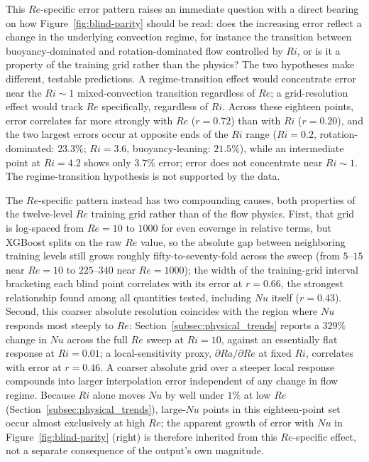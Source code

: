 This $Re$-specific error pattern raises an immediate question with a direct bearing on how Figure~\ref{fig:blind-parity} should be read: does the increasing error reflect a change in the underlying convection regime, for instance the transition between buoyancy-dominated and rotation-dominated flow controlled by $Ri$, or is it a property of the training grid rather than the physics? The two hypotheses make different, testable predictions. A regime-transition effect would concentrate error near the $Ri\sim1$ mixed-convection transition regardless of $Re$; a grid-resolution effect would track $Re$ specifically, regardless of $Ri$. Across these eighteen points, error correlates far more strongly with $Re$ ($r=0.72$) than with $Ri$ ($r=0.20$), and the two largest errors occur at opposite ends of the $Ri$ range ($Ri=0.2$, rotation-dominated: $23.3\%$; $Ri=3.6$, buoyancy-leaning: $21.5\%$), while an intermediate point at $Ri=4.2$ shows only $3.7\%$ error; error does not concentrate near $Ri\sim1$. The regime-transition hypothesis is not supported by the data.

The $Re$-specific pattern instead has two compounding causes, both properties of the twelve-level $Re$ training grid rather than of the flow physics. First, that grid is log-spaced from $Re=10$ to $1000$ for even coverage in relative terms, but XGBoost splits on the raw $Re$ value, so the absolute gap between neighboring training levels still grows roughly fifty-to-seventy-fold across the sweep (from $5$--$15$ near $Re=10$ to $225$--$340$ near $Re=1000$); the width of the training-grid interval bracketing each blind point correlates with its error at $r=0.66$, the strongest relationship found among all quantities tested, including $Nu$ itself ($r=0.43$). Second, this coarser absolute resolution coincides with the region where $Nu$ responds most steeply to $Re$: Section~\ref{subsec:physical_trends} reports a $329\%$ change in $Nu$ across the full $Re$ sweep at $Ri=10$, against an essentially flat response at $Ri=0.01$; a local-sensitivity proxy, $\partial Ra/\partial Re$ at fixed $Ri$, correlates with error at $r=0.46$. A coarser absolute grid over a steeper local response compounds into larger interpolation error independent of any change in flow regime. Because $Ri$ alone moves $Nu$ by well under $1\%$ at low $Re$ (Section~\ref{subsec:physical_trends}), large-$Nu$ points in this eighteen-point set occur almost exclusively at high $Re$; the apparent growth of error with $Nu$ in Figure~\ref{fig:blind-parity} (right) is therefore inherited from this $Re$-specific effect, not a separate consequence of the output's own magnitude.

